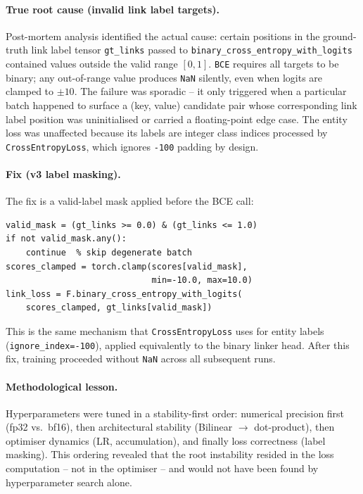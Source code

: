 \paragraph{True root cause (invalid link label targets).}
Post-mortem analysis identified the actual cause: certain positions in the ground-truth link label tensor \texttt{gt\_links} passed to \texttt{binary\_cross\_entropy\_with\_logits} contained values outside the valid range $[0, 1]$. \texttt{BCE} requires all targets to be binary; any out-of-range value produces \texttt{NaN} silently, even when logits are clamped to $\pm 10$. The failure was sporadic -- it only triggered when a particular batch happened to surface a (key, value) candidate pair whose corresponding link label position was uninitialised or carried a floating-point edge case. The entity loss was unaffected because its labels are integer class indices processed by \texttt{CrossEntropyLoss}, which ignores \texttt{-100} padding by design.

\paragraph{Fix (v3 label masking).}
The fix is a valid-label mask applied before the BCE call:
\begin{verbatim}
valid_mask = (gt_links >= 0.0) & (gt_links <= 1.0)
if not valid_mask.any():
    continue  % skip degenerate batch
scores_clamped = torch.clamp(scores[valid_mask],
                             min=-10.0, max=10.0)
link_loss = F.binary_cross_entropy_with_logits(
    scores_clamped, gt_links[valid_mask])
\end{verbatim}
This is the same mechanism that \texttt{CrossEntropyLoss} uses for entity labels (\texttt{ignore\_index=-100}), applied equivalently to the binary linker head. After this fix, training proceeded without \texttt{NaN} across all subsequent runs.

\paragraph{Methodological lesson.}
Hyperparameters were tuned in a stability-first order: numerical precision first (fp32 vs.\ bf16), then architectural stability (Bilinear $\to$ dot-product), then optimiser dynamics (LR, accumulation), and finally loss correctness (label masking). This ordering revealed that the root instability resided in the loss computation -- not in the optimiser -- and would not have been found by hyperparameter search alone.

